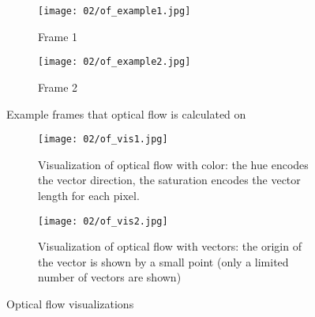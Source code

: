 \begin{figure}
\centering
    \begin{subfigure}[t]{0.5\textwidth}            
            \centering
            \texttt{[image: 02/of\_example1.jpg]}
            \caption{Frame 1}
    \end{subfigure}%
    \begin{subfigure}[t]{0.5\textwidth}
            \centering
            \texttt{[image: 02/of\_example2.jpg]}
            \caption{Frame 2}
    \end{subfigure}
    \caption[Optical flow example]{Example frames that optical flow is calculated on}\label{fig:of_example_bike}

    \quad
    \begin{subfigure}[t]{0.5\textwidth}            
            \centering
            \texttt{[image: 02/of\_vis1.jpg]}
            \caption{Visualization of optical flow with color: the hue encodes the vector direction, the saturation encodes the vector length for each pixel.}
    \end{subfigure}%
    \begin{subfigure}[t]{0.5\textwidth}
            \centering
            \texttt{[image: 02/of\_vis2.jpg]}
            \caption{Visualization of optical flow with vectors: the origin of the vector is shown by a small point (only a limited number of vectors are shown)}
    \end{subfigure}
    \caption[Optical flow visualizations]{Optical flow visualizations}\label{fig:of_vis}
\end{figure}

